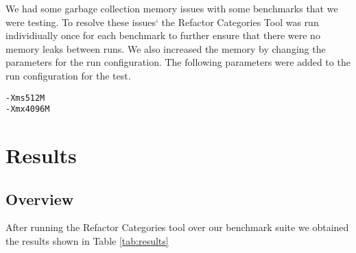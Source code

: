 We had some garbage collection memory issues with some benchmarks that we were testing. 
To resolve these issues` the Refactor Categories Tool was run individiually once for each benchmark to further ensure that there were no memory leaks between runs.
We also increased the memory by changing the parameters for the run configuration.  The following parameters were added to the run configuration for the test.

\begin{verbatim}
-Xms512M 
-Xmx4096M
\end{verbatim}



% 
% 
% 



\section{Results}
\subsection{Overview}
After running the Refactor Categories tool over our benchmark suite we obtained the results shown in Table \ref{tab:results}


